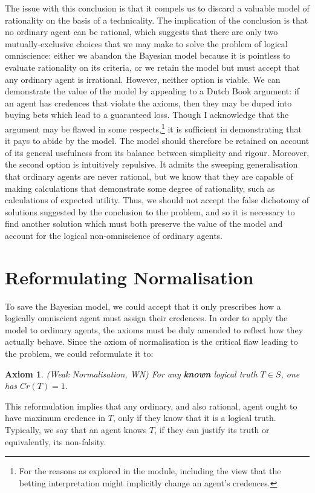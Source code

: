 \documentclass[12pt]{article}
\newtheorem{axiom}{Axiom}
\begin{document}
The issue with this conclusion is that it compels us to discard a valuable model of rationality on the basis of a technicality. The implication of the conclusion is that no ordinary agent can be rational, which suggests that there are only two mutually-exclusive choices that we may make to solve the problem of logical omniscience: either we abandon the Bayesian model because it is pointless to evaluate rationality on its criteria, or we retain the model but must accept that any ordinary agent is irrational. However, neither option is viable. We can demonstrate the value of the model by appealing to a Dutch Book argument: if an agent has credences that violate the axioms, then they may be duped into buying bets which lead to a guaranteed loss.\autocite[44]{bdrc} Though I acknowledge that the argument may be flawed in some respects,\footnote{For the reasons as explored in the module, including the view that the betting interpretation might implicitly change an agent's credences.} it is sufficient in demonstrating that it pays to abide by the model. The model should therefore be retained on account of its general usefulness from its balance between simplicity and rigour. Moreover, the second option is intuitively repulsive. It admits the sweeping generalisation that ordinary agents are never rational, but we know that they are capable of making calculations that demonstrate some degree of rationality, such as calculations of expected utility. Thus, we should not accept the false dichotomy of solutions suggested by the conclusion to the problem, and so it is necessary to find another solution which must both preserve the value of the model and account for the logical non-omniscience of ordinary agents.

\section{Reformulating Normalisation}
To save the Bayesian model, we could accept that it only prescribes how a logically omniscient agent must assign their credences. In order to apply the model to ordinary agents, the axioms must be duly amended to reflect how they actually behave. Since the axiom of normalisation is the critical flaw leading to the problem, we could reformulate it to:
\begin{axiom}
    (Weak Normalisation, WN) For any \textbf{known} logical truth $T\in S$, one has $Cr(T)=1$.
\end{axiom}
This reformulation implies that any ordinary, and also rational, agent ought to have maximum credence in $T$, only if they know that it is a logical truth.\autocite{sep} Typically, we say that an agent knows $T$, if they can justify its truth or equivalently, its non-falsity.
\end{document}
